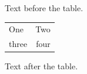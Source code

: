 \documentclass[12pt]{article}
\begin{document}
Text before the table.

\begin{tabular}{||l||r||}One & Two\\three & four\end{tabular}

Text after the table.
\end{document}
